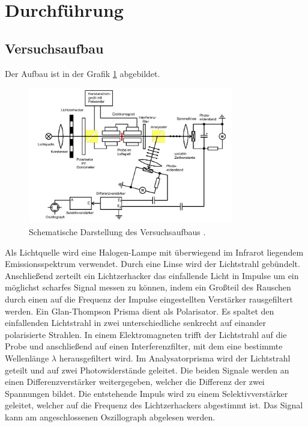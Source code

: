 \section{Durchführung}
\label{sec:Durchführung}
\subsection{Versuchsaufbau}
Der Aufbau ist in der Grafik \ref{fig:Aufbau} abgebildet.
\begin{figure}[H]
\center
\includegraphics[width=0.8\textwidth]{pics/Aufbau.jpg}
\caption{Schematische Darstellung des Versuchsaufbaus \cite{Anleitung}.}  %
\label{fig:Aufbau}
\end{figure}
Als Lichtquelle wird eine Halogen-Lampe mit überwiegend im Infrarot liegendem Emissionsspektrum verwendet.
Durch eine Linse wird der Lichtstrahl gebündelt.
Anschließend zerteilt ein Lichtzerhacker das einfallende Licht in Impulse um ein möglichst scharfes Signal messen zu können, indem
ein Großteil des Rauschen durch einen auf die Frequenz der Impulse eingestellten Verstärker rausgefiltert werden.
Ein Glan-Thompson Prisma dient als Polarisator. Es spaltet den einfallenden Lichtstrahl in zwei
unterschiedliche senkrecht auf einander polarisierte Strahlen. In einem Elektromagneten trifft der Lichtstrahl auf die Probe und anschließend auf einen
Interferenzfilter, mit dem eine bestimmte Wellenlänge $\lambda$ herausgefiltert wird.
Im Analysatorprisma wird der Lichtstrahl geteilt und auf zwei Photowiderstände
geleitet. Die beiden Signale werden an einen Differenzverstärker weitergegeben,
welcher die Differenz der zwei Spannungen bildet. Die entstehende Impuls wird zu einem Selektivverstärker geleitet,
welcher auf die Frequenz des Lichtzerhackers abgestimmt ist.
Das Signal kann am angeschlossenen Oszillograph abgelesen werden.
